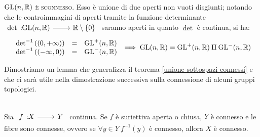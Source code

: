 \begin{observe}
$\operatorname{GL}(n,\mathbb{R})$\textsc{ è sconnesso}.
Esso è unione di due aperti non vuoti disgiunti; notando che le controimmagini di aperti tramite la funzione determinante \\ $\funz \det {\gl(n,\realset)} {\realset\setminus\{0\}}$ saranno aperti in quanto $\det$ è continua, si ha:
		\begin{gather*}
			\begin{array}{lcl}
				\det^{-1} \left( (0,+\infty)\right) & = & \operatorname{GL} ^+ (n,\mathbb{R}) \\
				\det^{-1} \left( (-\infty,0)\right) & = & \operatorname{GL} ^- (n,\mathbb{R}) \\
			\end{array}
		\implies \operatorname{GL}(n,\mathbb{R})=\operatorname{GL}^+(n,\mathbb{R}) \amalg \operatorname{GL}^-(n,\mathbb{R})
		\end{gather*}
	\vspace{-3mm}
\end{observe}
 Dimostriamo un lemma che generalizza il teorema \ref{unione sottospazi connessi} e che ci sarà utile nella dimostrazione successiva sulla connessione di alcuni gruppi topologici.
\begin{lemming}~{}\label{connessione e fibre}\\
	Sia $\funz f X Y$ continua. Se $f$ è suriettiva aperta o chiusa, $Y$ è connesso e le fibre sono connesse, ovvero se $\forall y\in Y \ f^{-1}(y)$ è connesso, allora $X$ è connesso.
\end{lemming}
